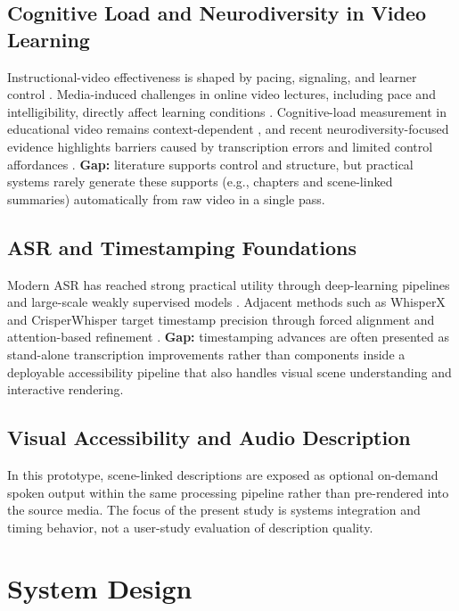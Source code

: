 \documentclass[conference]{IEEEtran}
\begin{document}
\subsection{Cognitive Load and Neurodiversity in Video Learning}
Instructional-video effectiveness is shaped by pacing, signaling, and learner control \cite{Mayer2020,CastroAlonso2021}. Media-induced challenges in online video lectures, including pace and intelligibility, directly affect learning conditions \cite{Lange2020}. Cognitive-load measurement in educational video remains context-dependent \cite{Kruger2016}, and recent neurodiversity-focused evidence highlights barriers caused by transcription errors and limited control affordances \cite{LeCunff2024,Horlin2024}. \textbf{Gap:} literature supports control and structure, but practical systems rarely generate these supports (e.g., chapters and scene-linked summaries) automatically from raw video in a single pass.

\subsection{ASR and Timestamping Foundations}
Modern ASR has reached strong practical utility through deep-learning pipelines \cite{Malik2020} and large-scale weakly supervised models \cite{Radford2022}. Adjacent methods such as WhisperX and CrisperWhisper target timestamp precision through forced alignment and attention-based refinement \cite{Bain2023,Wagner2024}. \textbf{Gap:} timestamping advances are often presented as stand-alone transcription improvements rather than components inside a deployable accessibility pipeline that also handles visual scene understanding and interactive rendering.

\subsection{Visual Accessibility and Audio Description}
In this prototype, scene-linked descriptions are exposed as optional on-demand spoken output within the same processing pipeline rather than pre-rendered into the source media. The focus of the present study is systems integration and timing behavior, not a user-study evaluation of description quality.

\section{System Design}
\end{document}
